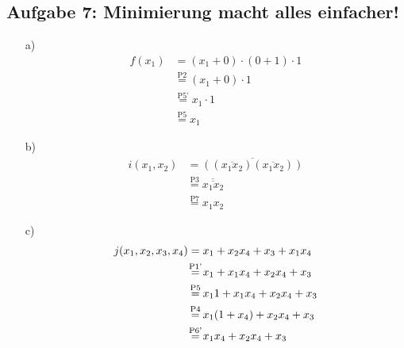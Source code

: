 \documentclass{article}
\begin{document}
	\subsection*{Aufgabe 7: Minimierung macht alles einfacher!}
	\begin{enumerate}
		\item[a)]
		\begin{align*}
			f(x_1) &= (x_1 + 0) \cdot (0 + 1) \cdot 1 \\
			&\stackrel{\text{P2}}{=} (x_1 + 0) \cdot 1 \\
			&\stackrel{\text{P5'}}{=} x_1 \cdot 1 \\
			&\stackrel{\text{P5}}{=} x_1
		\end{align*}
		\item[b)]
		\begin{align*}
			i(x_1, x_2) &= \overline{((\overline{x_1 x_2})(\overline{x_1 x_2}))} \\
			&\stackrel{\text{P3}}{=} \overline{\overline{x_1 x_2}} \\
			&\stackrel{\text{P7}}{=} x_1 x_2
		\end{align*}
		\item[c)]
		\begin{align*}
			j(x_1, x_2, x_3, x_4) &= x_1 + x_2 x_4 + x_3 + x_1 x_4 \\
			&\stackrel{\mathclap{\text{P1'}}}{=} x_1 + x_1 x_4 + x_2 x_4 + x_3 \\
			&\stackrel{\mathclap{\text{P5}}}{=} x_1 1 + x_1 x_4 + x_2 x_4 + x_3 \\
			&\stackrel{\mathclap{\text{P4}}}{=} x_1(1 + x_4) + x_2 x_4 + x_3 \\
			&\stackrel{\mathclap{\text{P6'}}}{=} x_1 x_4 + x_2 x_4 + x_3 \\
		\end{align*}
	\end{enumerate}
\end{document}

